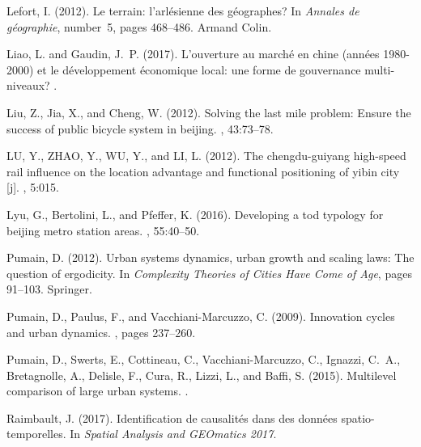 \begin{thebibliography}{}
Lefort, I. (2012).
\newblock Le terrain: l'arl{\'e}sienne des g{\'e}ographes?
\newblock In {\em Annales de g{\'e}ographie}, number~5, pages 468--486. Armand
  Colin.

Liao, L. and Gaudin, J.~P. (2017).
\newblock L'ouverture au march{\'e} en chine (ann{\'e}es 1980-2000) et le
  d{\'e}veloppement {\'e}conomique local: une forme de gouvernance
  multi-niveaux?
.

Liu, Z., Jia, X., and Cheng, W. (2012).
\newblock Solving the last mile problem: Ensure the success of public bicycle
  system in beijing.
, 43:73--78.

LU, Y., ZHAO, Y., WU, Y., and LI, L. (2012).
\newblock The chengdu-guiyang high-speed rail influence on the location
  advantage and functional positioning of yibin city [j].
, 5:015.

Lyu, G., Bertolini, L., and Pfeffer, K. (2016).
\newblock Developing a tod typology for beijing metro station areas.
, 55:40--50.

Pumain, D. (2012).
\newblock Urban systems dynamics, urban growth and scaling laws: The question
  of ergodicity.
\newblock In {\em Complexity Theories of Cities Have Come of Age}, pages
  91--103. Springer.

Pumain, D., Paulus, F., and Vacchiani-Marcuzzo, C. (2009).
\newblock Innovation cycles and urban dynamics.
, pages
  237--260.

Pumain, D., Swerts, E., Cottineau, C., Vacchiani-Marcuzzo, C., Ignazzi, C.~A.,
  Bretagnolle, A., Delisle, F., Cura, R., Lizzi, L., and Baffi, S. (2015).
\newblock Multilevel comparison of large urban systems.
.

Raimbault, J. (2017).
\newblock Identification de causalit{\'e}s dans des donn{\'e}es
  spatio-temporelles.
\newblock In {\em Spatial Analysis and GEOmatics 2017}.


\end{thebibliography}
